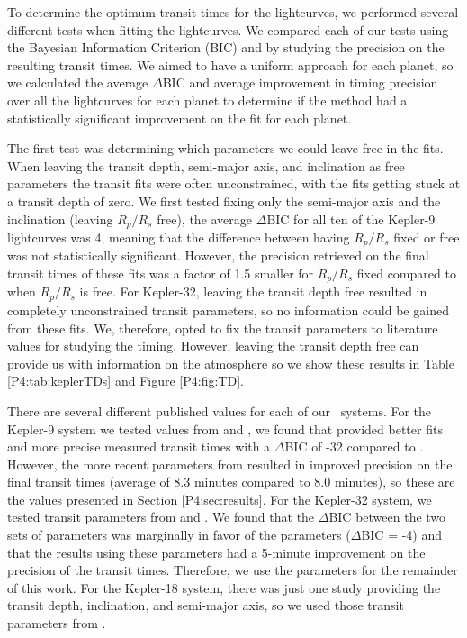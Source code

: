 To determine the optimum transit times for the lightcurves, we performed several different tests when fitting the lightcurves. We compared each of our tests using the Bayesian Information Criterion (BIC) and by studying the precision on the resulting transit times. We aimed to have a uniform approach for each planet, so we calculated the average $\Delta$BIC and average improvement in timing precision over all the lightcurves for each planet to determine if the method had a statistically significant improvement on the fit for each planet.

The first test was determining which parameters we could leave free in the fits. When leaving the transit depth, semi-major axis, and inclination as free parameters the transit fits were often unconstrained, with the fits getting stuck at a transit depth of zero. We first tested fixing only the semi-major axis and the inclination (leaving $R_p/R_s$ free), the average $\Delta$BIC for all ten of the Kepler-9 lightcurves was 4, meaning that the difference between having $R_p/R_s$ fixed or free was not statistically significant. However, the precision retrieved on the final transit times of these fits was a factor of 1.5 smaller for $R_p/R_s$ fixed compared to when $R_p/R_s$ is free. For Kepler-32, leaving the transit depth free resulted in completely unconstrained transit parameters, so no information could be gained from these fits. We, therefore, opted to fix the transit parameters to literature values for studying the timing. However, leaving the transit depth free can provide us with information on the atmosphere so we show these results in Table \ref{P4:tab:keplerTDs} and Figure \ref{P4:fig:TD}.

There are several different published values for each of our \Kepler~systems. For the Kepler-9 system we tested values from \citet{Holman2010} and \citet{Borsato2019}, we found that \citet{Holman2010} provided better fits and more precise measured transit times with a $\Delta$BIC of -32 compared to \citet{Borsato2019}. However, the more recent parameters from \citet{Borsato2019} resulted in improved precision on the final transit times (average of 8.3 minutes compared to 8.0 minutes), so these are the values presented in Section \ref{P4:sec:results}. For the Kepler-32 system, we tested transit parameters from \citet{Fabrycky2012} and \citet{Muirhead2012}. We found that the $\Delta$BIC between the two sets of parameters was marginally in favor of the \citet{Muirhead2012} parameters ($\Delta$BIC = -4) and that the results using these parameters had a 5-minute improvement on the precision of the transit times. Therefore, we use the \citet{Muirhead2012} parameters for the remainder of this work. For the Kepler-18 system, there was just one study providing the transit depth, inclination, and semi-major axis, so we used those transit parameters from \citet{Cochran2011}.

